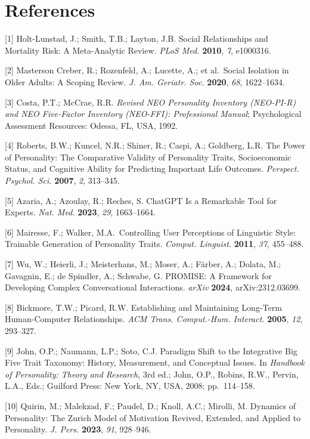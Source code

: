 \section{References}\label{references}


{[}1{]} Holt-Lunstad, J.; Smith, T.B.; Layton, J.B. Social Relationships and Mortality Risk: A Meta-Analytic Review. \emph{PLoS Med.} \textbf{2010}, \emph{7}, e1000316.

{[}2{]} Masterson Creber, R.; Rozenfeld, A.; Lucette, A.; et al.~Social Isolation in Older Adults: A Scoping Review. \emph{J. Am. Geriatr. Soc.} \textbf{2020}, \emph{68}, 1622--1634.

{[}3{]} Costa, P.T.; McCrae, R.R. \emph{Revised NEO Personality Inventory (NEO-PI-R) and NEO Five-Factor Inventory (NEO-FFI): Professional Manual}; Psychological Assessment Resources: Odessa, FL, USA, 1992.

{[}4{]} Roberts, B.W.; Kuncel, N.R.; Shiner, R.; Caspi, A.; Goldberg, L.R. The Power of Personality: The Comparative Validity of Personality Traits, Socioeconomic Status, and Cognitive Ability for Predicting Important Life Outcomes. \emph{Perspect. Psychol. Sci.} \textbf{2007}, \emph{2}, 313--345.

{[}5{]} Azaria, A.; Azoulay, R.; Reches, S. ChatGPT Is a Remarkable Tool for Experts. \emph{Nat. Med.} \textbf{2023}, \emph{29}, 1663--1664.

{[}6{]} Mairesse, F.; Walker, M.A.~Controlling User Perceptions of Linguistic Style: Trainable Generation of Personality Traits. \emph{Comput. Linguist.} \textbf{2011}, \emph{37}, 455--488.

{[}7{]} Wu, W.; Heierli, J.; Meisterhans, M.; Moser, A.; Färber, A.; Dolata, M.; Gavagnin, E.; de Spindler, A.; Schwabe, G. PROMISE: A Framework for Developing Complex Conversational Interactions. \emph{arXiv} \textbf{2024}, arXiv:2312.03699.

{[}8{]} Bickmore, T.W.; Picard, R.W. Establishing and Maintaining Long-Term Human-Computer Relationships. \emph{ACM Trans. Comput.-Hum. Interact.} \textbf{2005}, \emph{12}, 293--327.

{[}9{]} John, O.P.; Naumann, L.P.; Soto, C.J. Paradigm Shift to the Integrative Big Five Trait Taxonomy: History, Measurement, and Conceptual Issues. In \emph{Handbook of Personality: Theory and Research}, 3rd ed.; John, O.P., Robins, R.W., Pervin, L.A., Eds.; Guilford Press: New York, NY, USA, 2008; pp.~114--158.

{[}10{]} Quirin, M.; Malekzad, F.; Paudel, D.; Knoll, A.C.; Mirolli, M. Dynamics of Personality: The Zurich Model of Motivation Revived, Extended, and Applied to Personality. \emph{J. Pers.} \textbf{2023}, \emph{91}, 928--946.

